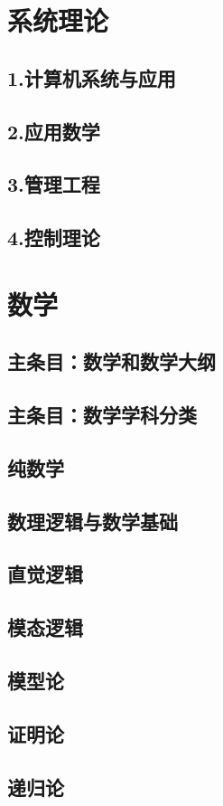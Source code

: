 \chapter{系统理论}
\section{1.计算机系统与应用}
\section{2.应用数学}
\section{3.管理工程}
\section{4.控制理论}


\chapter{数学}
\section{主条目：数学和数学大纲}
\section{主条目：数学学科分类}
\section{纯数学}
\section{数理逻辑与数学基础}
\section{直觉逻辑}
\section{模态逻辑}
\section{模型论}
\section{证明论}
\section{递归论}
